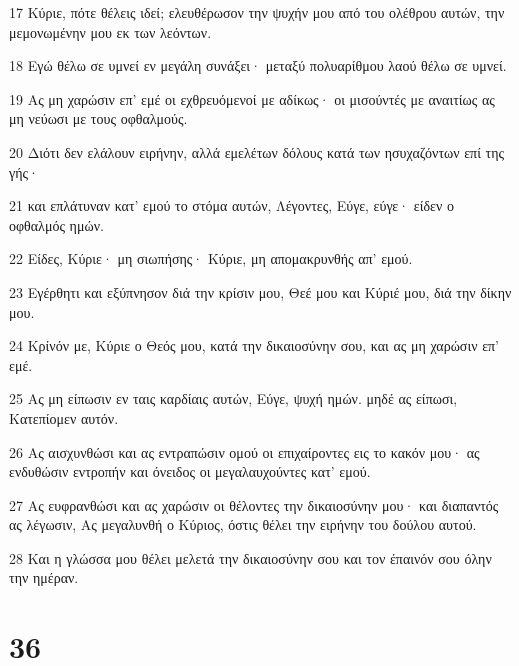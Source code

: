 \par 17 Κύριε, πότε θέλεις ιδεί; ελευθέρωσον την ψυχήν μου από του ολέθρου αυτών, την μεμονωμένην μου εκ των λεόντων.
\par 18 Εγώ θέλω σε υμνεί εν μεγάλη συνάξει· μεταξύ πολυαρίθμου λαού θέλω σε υμνεί.
\par 19 Ας μη χαρώσιν επ' εμέ οι εχθρευόμενοί με αδίκως· οι μισούντές με αναιτίως ας μη νεύωσι με τους οφθαλμούς.
\par 20 Διότι δεν ελάλουν ειρήνην, αλλά εμελέτων δόλους κατά των ησυχαζόντων επί της γής·
\par 21 και επλάτυναν κατ' εμού το στόμα αυτών, Λέγοντες, Εύγε, εύγε· είδεν ο οφθαλμός ημών.
\par 22 Είδες, Κύριε· μη σιωπήσης· Κύριε, μη απομακρυνθής απ' εμού.
\par 23 Εγέρθητι και εξύπνησον διά την κρίσιν μου, Θεέ μου και Κύριέ μου, διά την δίκην μου.
\par 24 Κρίνόν με, Κύριε ο Θεός μου, κατά την δικαιοσύνην σου, και ας μη χαρώσιν επ' εμέ.
\par 25 Ας μη είπωσιν εν ταις καρδίαις αυτών, Εύγε, ψυχή ημών. μηδέ ας είπωσι, Κατεπίομεν αυτόν.
\par 26 Ας αισχυνθώσι και ας εντραπώσιν ομού οι επιχαίροντες εις το κακόν μου· ας ενδυθώσιν εντροπήν και όνειδος οι μεγαλαυχούντες κατ' εμού.
\par 27 Ας ευφρανθώσι και ας χαρώσιν οι θέλοντες την δικαιοσύνην μου· και διαπαντός ας λέγωσιν, Ας μεγαλυνθή ο Κύριος, όστις θέλει την ειρήνην του δούλου αυτού.
\par 28 Και η γλώσσα μου θέλει μελετά την δικαιοσύνην σου και τον έπαινόν σου όλην την ημέραν.

\chapter{36}

